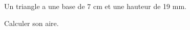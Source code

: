 \documentclass[exercice]{thedocument}%
\begin{document}
%
Un triangle a une base de 7 cm et une hauteur de 19 mm.\par\medskip
Calculer son aire.
\answerspace{2cm}
\end{document}
